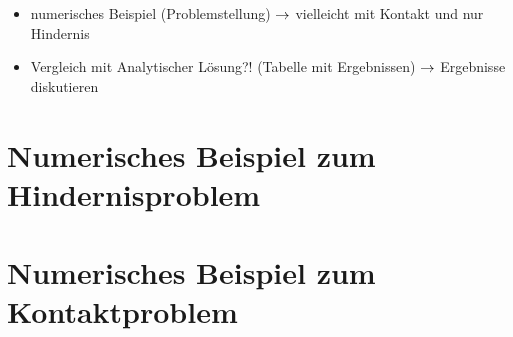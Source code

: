 \label{kap:6}


\begin{itemize}
\item numerisches Beispiel (Problemstellung) $\rightarrow$ vielleicht mit Kontakt und nur Hindernis
\item Vergleich mit Analytischer Lösung?! (Tabelle mit Ergebnissen) $\rightarrow$ Ergebnisse diskutieren
\end{itemize}

\section{Numerisches Beispiel zum Hindernisproblem}
\label{kap:6.1}



\section{Numerisches Beispiel zum Kontaktproblem}
\label{kap:6.2}




\newpage

